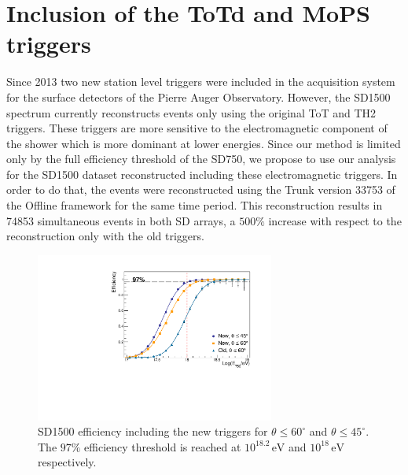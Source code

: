 \documentclass[12pt,a4paper]{article}
\newcommand{\eV}{\, \mathrm{eV}}
\begin{document}

\section{Inclusion of the ToTd and MoPS triggers}
\label{sec:new}

Since 2013 two new station level triggers were included in the acquisition system for the surface detectors of the Pierre Auger Observatory. However, the SD1500 spectrum currently reconstructs events only using the original ToT and TH2 triggers. These triggers are more sensitive to the electromagnetic component of the shower which is more dominant at lower energies. Since our method is limited only by the full efficiency threshold of the SD750, we propose to use our analysis for the SD1500 dataset reconstructed including these electromagnetic triggers.
In order to do that, the events were reconstructed using the Trunk version 33753 of the Offline framework for the same time period. This reconstruction results in 74853 simultaneous events in both SD arrays, a $500\%$ increase with respect to the reconstruction only with the old triggers.

\begin{figure}[h]
    \begin{center}
        \includegraphics[width=0.7\textwidth]{plots/NewCut.pdf}
        \caption{SD1500 efficiency including the new triggers for $\theta\leq60^\circ$ and $\theta\leq45^\circ$. The $97\%$ efficiency threshold is reached at $10^{18.2}\eV$ and $10^{18}\eV$ respectively.
        \label{fig:NewCut}}
        \vspace{-0.5cm}
    \end{center}
\end{figure}
\end{document}
